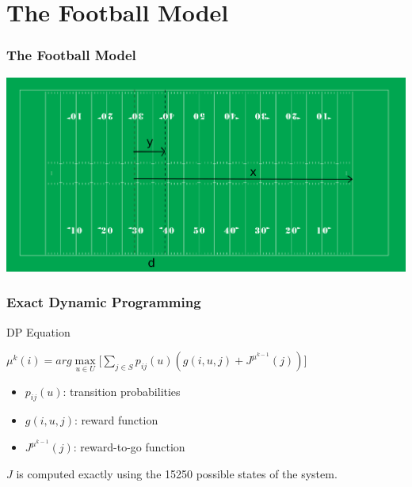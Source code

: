 \documentclass{beamer}
\begin{document}
\section{The Football Model}
\begin{frame}
\frametitle{The Football Model}

\begin{center}
\includegraphics[scale=0.3]{field}
\end{center}
\end{frame}

\begin{frame}
\frametitle{Exact Dynamic Programming}
\begin{block}{DP Equation}
\begin{center}
$\mu^{k}(i) = arg\max\limits_{u \in U} \Big[ \sum\limits_{j \in S} p_{ij}(u)(g(i,u,j) +  J^{\mu^{k-1}}(j))\Big]$
\end{center}
\end{block}
\begin{itemize}
\item $p_{ij}(u)$: transition probabilities
\item $g(i,u,j)$: reward function
\item $J^{\mu^{k-1}}(j)$: reward-to-go function
\end{itemize}
$J$ is computed exactly using the 15250 possible states of the system.
\end{frame}
\end{document}
